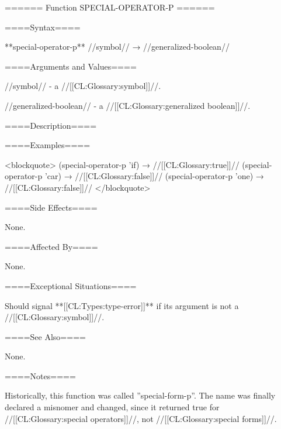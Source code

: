 ====== Function SPECIAL-OPERATOR-P ======

====Syntax====

**special-operator-p** //symbol// → //generalized-boolean//

====Arguments and Values====

//symbol// - a //[[CL:Glossary:symbol]]//.

//generalized-boolean// - a //[[CL:Glossary:generalized boolean]]//.

====Description====


====Examples====

<blockquote> (special-operator-p 'if) → //[[CL:Glossary:true]]// (special-operator-p 'car) → //[[CL:Glossary:false]]// (special-operator-p 'one) → //[[CL:Glossary:false]]// </blockquote>

====Side Effects====

None.

====Affected By====

None.

====Exceptional Situations====

Should signal **[[CL:Types:type-error]]** if its argument is not a //[[CL:Glossary:symbol]]//.

====See Also====

None.

====Notes====

Historically, this function was called ''special-form-p''. The name was finally declared a misnomer and changed, since it returned true for //[[CL:Glossary:special operators]]//, not //[[CL:Glossary:special forms]]//.

